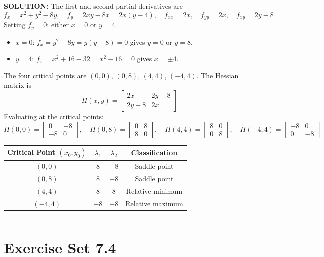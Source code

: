 \documentclass{article}
\begin{document}
\textbf{SOLUTION:} The first and second partial derivatives are
\[
  f_x = x^2+y^2-8y,\quad f_y = 2xy-8x = 2x(y-4),\quad
  f_{xx}=2x,\quad f_{yy}=2x,\quad f_{xy}=2y-8
\]
Setting $f_y=0$: either $x=0$ or $y=4$.
\begin{itemize}
  \item $x=0$: $f_x=y^2-8y=y(y-8)=0$ gives $y=0$ or $y=8$.
  \item $y=4$: $f_x=x^2+16-32=x^2-16=0$ gives $x=\pm4$.
\end{itemize}
The four critical points are $(0,0)$, $(0,8)$, $(4,4)$, $(-4,4)$. The Hessian matrix is
\[
  H(x,y) = \begin{bmatrix}2x&2y-8\\2y-8&2x\end{bmatrix}
\]
Evaluating at the critical points:
\[
  H(0,0) = \begin{bmatrix}0&-8\\-8&0\end{bmatrix},\quad
  H(0,8) = \begin{bmatrix}0&8\\8&0\end{bmatrix},\quad
  H(4,4) = \begin{bmatrix}8&0\\0&8\end{bmatrix},\quad
  H(-4,4) = \begin{bmatrix}-8&0\\0&-8\end{bmatrix}
\]

\begin{center}
\renewcommand{\arraystretch}{1.3}
\begin{tabular}{|c|c|c|c|}
\hline
\textbf{Critical Point $(x_0,y_0)$} & $\lambda_1$ & $\lambda_2$ & \textbf{Classification}\\
\hline
$(0,0)$ & $8$ & $-8$ & Saddle point\\
\hline
$(0,8)$ & $8$ & $-8$ & Saddle point\\
\hline
$(4,4)$ & $8$ & $8$ & Relative minimum\\
\hline
$(-4,4)$ & $-8$ & $-8$ & Relative maximum\\
\hline
\end{tabular}
\end{center}

\vspace{3mm}
\noindent\rule{\linewidth}{0.5pt}

\section*{Exercise Set 7.4}
\end{document}
